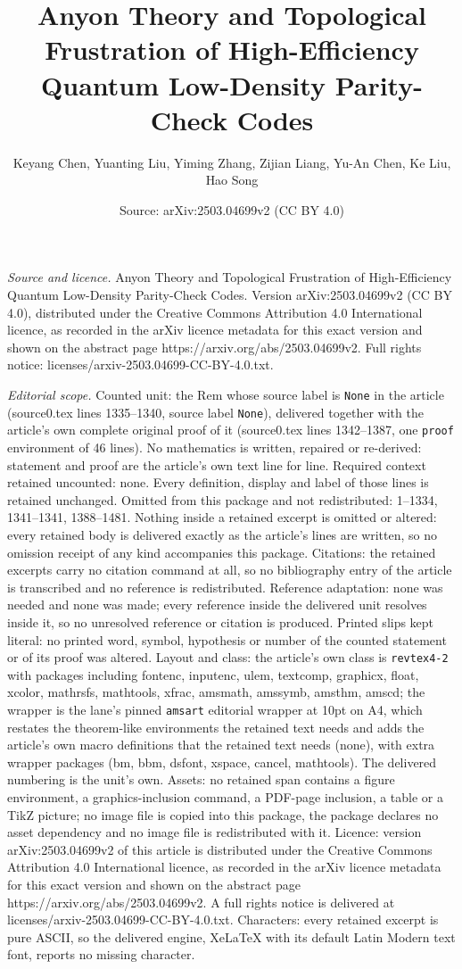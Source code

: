 \documentclass[10pt,a4paper]{amsart}
\title[Anyon Theory and Topological Frustration of High-Efficiency ]{Anyon Theory and Topological Frustration of High-Efficiency Quantum Low-Density Parity-Check Codes}
\author{Keyang Chen, Yuanting Liu, Yiming Zhang, Zijian Liang, Yu-An Chen, Ke Liu, Hao Song}
\date{Source: arXiv:2503.04699v2 (CC BY 4.0)}
\begin{document}
\maketitle

\noindent\emph{Source and licence.} Anyon Theory and Topological Frustration of High-Efficiency Quantum Low-Density Parity-Check Codes. Version arXiv:2503.04699v2 (CC BY 4.0), distributed under the Creative Commons Attribution 4.0 International licence, as recorded in the arXiv licence metadata for this exact version and shown on the abstract page https://arxiv.org/abs/2503.04699v2. Full rights notice: licenses/arxiv-2503.04699-CC-BY-4.0.txt.\par\smallskip

\noindent\textit{Editorial scope.} Counted unit: the Rem whose source label is \texttt{None} in the article (source0.tex lines 1335--1340, source label \texttt{None}), delivered together with the article's own complete original proof of it (source0.tex lines 1342--1387, one \texttt{proof} environment of 46 lines). No mathematics is written, repaired or re-derived: statement and proof are the article's own text line for line. Required context retained uncounted: none. Every definition, display and label of those lines is retained unchanged. Omitted from this package and not redistributed: 1--1334, 1341--1341, 1388--1481. Nothing inside a retained excerpt is omitted or altered: every retained body is delivered exactly as the article's lines are written, so no omission receipt of any kind accompanies this package. Citations: the retained excerpts carry no citation command at all, so no bibliography entry of the article is transcribed and no reference is redistributed. Reference adaptation: none was needed and none was made; every reference inside the delivered unit resolves inside it, so no unresolved reference or citation is produced. Printed slips kept literal: no printed word, symbol, hypothesis or number of the counted statement or of its proof was altered. Layout and class: the article's own class is \texttt{revtex4-2} with packages including fontenc, inputenc, ulem, textcomp, graphicx, float, xcolor, mathrsfs, mathtools, xfrac, amsmath, amssymb, amsthm, amscd; the wrapper is the lane's pinned \texttt{amsart} editorial wrapper at 10pt on A4, which restates the theorem-like environments the retained text needs and adds the article's own macro definitions that the retained text needs (none), with extra wrapper packages (bm, bbm, dsfont, xspace, cancel, mathtools). The delivered numbering is the unit's own. Assets: no retained span contains a figure environment, a graphics-inclusion command, a PDF-page inclusion, a table or a TikZ picture; no image file is copied into this package, the package declares no asset dependency and no image file is redistributed with it. Licence: version arXiv:2503.04699v2 of this article is distributed under the Creative Commons Attribution 4.0 International licence, as recorded in the arXiv licence metadata for this exact version and shown on the abstract page https://arxiv.org/abs/2503.04699v2. A full rights notice is delivered at licenses/arxiv-2503.04699-CC-BY-4.0.txt. Characters: every retained excerpt is pure ASCII, so the delivered engine, XeLaTeX with its default Latin Modern text font, reports no missing character.
\end{document}
